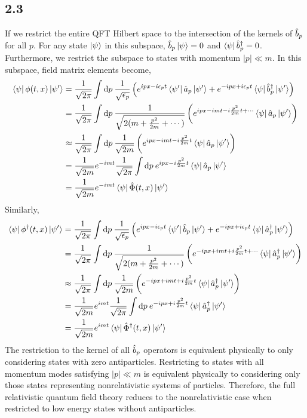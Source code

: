 \documentclass[12pt]{extarticle}
\begin{document}
\subsection*{2.3}

If we restrict the entire QFT Hilbert space to the intersection of the kernels of $\hat{b}_p$ for all $p$. For any state $\left| \psi \right>$ in this subspace, $\hat{b}_p \left| \psi \right> = 0$ and $\left< \psi \right| \hat{b}^\dagger_p = 0$. Furthermore, we restrict the subspace to states with momentum $|p| \ll m$. In this subspace, field matrix elements become,
\begin{align*}
\left< \psi \right| \phi(t, x) \left| \psi' \right> & = \frac{1}{\sqrt{2\pi}} \int \mathrm{d}p \: \frac{1}{\sqrt{\epsilon_p}} \left( e^{i p x - i \epsilon_p t} \left< \psi' \right| \hat{a}_p \left| \psi' \right> + e^{- i p x + i \epsilon_p t} \left< \psi \right| \hat{b}^\dagger_p  \left| \psi' \right> \right)
\\
& = \frac{1}{\sqrt{2\pi}} \int \mathrm{d}p \: \frac{1}{\sqrt{2(m + \frac{p^2}{2m} + \cdots)}} \left( e^{i p x - i m t - i \frac{p^2}{2m} t + \cdots } \left< \psi \right| \hat{a}_p \left| \psi' \right> \right)
\\
& \approx \frac{1}{\sqrt{2\pi}} \int \mathrm{d}p \: \frac{1}{\sqrt{2m}} \left( e^{i p x - i m t - i \frac{p^2}{2m} t } \left< \psi \right| \hat{a}_p \left| \psi' \right> \right)
\\
& = \frac{1}{\sqrt{2m}} e^{- i m t} \frac{1}{\sqrt{2 \pi}}  \int \mathrm{d}p \: e^{i p x - i \frac{p^2}{2m} t } \left< \psi \right| \hat{a}_p \left| \psi' \right> 
\\
& = \frac{1}{\sqrt{2m}} e^{- i m t} \left< \psi \right| \hat{\Phi}(t, x) \left| \psi' \right> 
\end{align*}
Similarly,
\begin{align*}
\left< \psi \right| \phi^\dagger(t, x) \left| \psi' \right> & = \frac{1}{\sqrt{2\pi}} \int \mathrm{d}p \: \frac{1}{\sqrt{\epsilon_p}} \left( e^{i p x - i \epsilon_p t} \left< \psi' \right| \hat{b}_p \left| \psi' \right> + e^{- i p x + i \epsilon_p t} \left< \psi \right| \hat{a}^\dagger_p  \left| \psi' \right> \right)
\\
& = \frac{1}{\sqrt{2\pi}} \int \mathrm{d}p \: \frac{1}{\sqrt{2(m + \frac{p^2}{2m} + \cdots)}} \left( e^{-i p x + i m t + i \frac{p^2}{2m} t + \cdots } \left< \psi \right| \hat{a}^\dagger_p \left| \psi' \right> \right)
\\
& \approx \frac{1}{\sqrt{2\pi}} \int \mathrm{d}p \: \frac{1}{\sqrt{2m}} \left( e^{-i p x + i m t + i \frac{p^2}{2m} t } \left< \psi \right| \hat{a}^\dagger_p \left| \psi' \right> \right)
\\
& = \frac{1}{\sqrt{2m}} e^{i m t} \frac{1}{\sqrt{2 \pi}}  \int \mathrm{d}p \: e^{- i p x + i \frac{p^2}{2m} t } \left< \psi \right| \hat{a}^\dagger_p \left| \psi' \right> 
\\
& = \frac{1}{\sqrt{2m}} e^{i m t} \left< \psi \right| \hat{\Phi}^\dagger(t, x) \left| \psi' \right> 
\end{align*}
The restriction to the kernel of all $\hat{b}_p$ operators is equivalent physically to only considering states with zero antiparticles. Restricting to states with all momentum modes satisfying $|p| \ll m$ is equivalent physically to considering only those states representing nonrelativistic systems of particles. Therefore, the full relativistic quantum field theory reduces to the nonrelativistic case when restricted to low energy states without antiparticles. 
\end{document}
